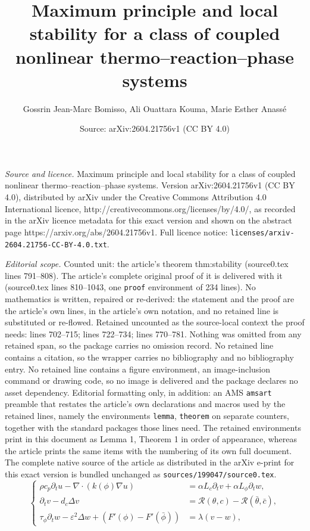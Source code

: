 \documentclass[10pt,a4paper]{amsart}
\title{Maximum principle and local stability for a class of coupled nonlinear thermo--reaction--phase systems}
\author{Gossrin Jean-Marc Bomisso, Ali Ouattara Kouma, Marie Esther Anass\'e}
\date{Source: arXiv:2604.21756v1 (CC BY 4.0)}
\newcommand{\ptn}{\partial_t}
\begin{document}
\maketitle

\noindent\emph{Source and licence.} Maximum principle and local stability for a class of coupled nonlinear thermo--reaction--phase systems. Version arXiv:2604.21756v1 (CC BY 4.0), distributed by arXiv under the Creative Commons Attribution 4.0 International licence, http://creativecommons.org/licenses/by/4.0/, as recorded in the arXiv licence metadata for this exact version and shown on the abstract page https://arxiv.org/abs/2604.21756v1. Full licence notice: \texttt{licenses/arxiv-2604.21756-CC-BY-4.0.txt}.\par\smallskip

\noindent\textit{Editorial scope.} Counted unit: the article's theorem thm:stability (source0.tex lines 791--808). The article's complete original proof of it is delivered with it (source0.tex lines 810--1043, one \texttt{proof} environment of 234 lines). No mathematics is written, repaired or re-derived: the statement and the proof are the article's own lines, in the article's own notation, and no retained line is substituted or re-flowed.  Retained uncounted as the source-local context the proof needs: lines 702--715; lines 722--734; lines 770--781.  Nothing was omitted from any retained span, so the package carries no omission record.  No retained line contains a citation, so the wrapper carries no bibliography and no bibliography entry.  No retained line contains a figure environment, an image-inclusion command or drawing code, so no image is delivered and the package declares no asset dependency.  Editorial formatting only, in addition: an AMS \texttt{amsart} preamble that restates the article's own declarations and macros used by the retained lines, namely the environments \texttt{lemma}, \texttt{theorem} on separate counters, together with the standard packages those lines need.  The retained environments print in this document as Lemma 1, Theorem 1 in order of appearance, whereas the article prints the same items with the numbering of its own full document.  The complete native source of the article as distributed in the arXiv e-print for this exact version is bundled unchanged as \texttt{sources/199047/source0.tex}.
	\begin{equation}
		\label{eq:uvw}
		\left\{
		\begin{aligned}
			\rho c_p \ptn u - \nabla\cdot(k(\phi)\nabla u)
			&= \alpha L_c \ptn v + \alpha L_\phi \ptn w, \\[4pt]
			\ptn v - d_c \Delta v
			&= \mathcal{R}(\theta,c) - \mathcal{R}(\bar\theta,\bar c), \\[4pt]
			\tau_\phi \ptn w - \varepsilon^2\Delta w
			+ (F'(\phi) - F'(\bar\phi))
			&= \lambda(v - w),
		\end{aligned}
		\right.
	\end{equation}
\end{document}
